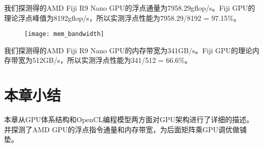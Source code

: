 我们探测得的AMD Fiji R9 Nano GPU的浮点通量为7958.29gflop/s。Fiji GPU的理论浮点峰值为8192gflop/s，所以实测浮点性能为7958.29/8192 = 97.15\%。

\begin{figure}[htbp]
	\centering
	\texttt{[image: mem\_bandwidth]}
	\label{fig:mem_bandwidth}
\end{figure}

我们探测得的AMD Fiji R9 Nano GPU的内存带宽为341GB/s。Fiji GPU的理论内存带宽为512GB/s，所以实测浮点性能为341/512 = 66.6\%。



\section{本章小结}
本章从GPU体系结构和OpenCL编程模型两方面对GPU架构进行了详细的描述。并探测了AMD GPU的浮点指令通量和内存带宽，为后面矩阵乘GPU调优做铺垫。


